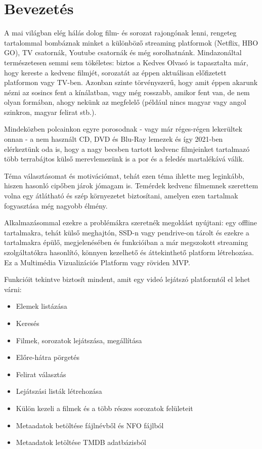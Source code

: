 \chapter{Bevezetés} %
\label{ch:intro}

A mai világban elég hálás dolog film- és sorozat rajongónak lenni, rengeteg tartalommal bombáznak minket a különböző streaming platformok (Netflix, HBO GO), TV csatornák, Youtube csatornák és még sorolhatnánk. Mindazonáltal természetesen semmi sem tökéletes: biztos a Kedves Olvasó is tapasztalta már, hogy kereste a kedvenc filmjét, sorozatát az éppen aktuálisan előfizetett platformon vagy TV-ben. Azonban szinte törvényszerű, hogy amit éppen akarunk nézni az sosincs fent a kínálatban, vagy még rosszabb, amikor fent van, de nem olyan formában, ahogy nekünk az megfelelő (például nincs magyar vagy angol szinkron, magyar felirat stb.).

Mindeközben polcainkon egyre porosodnak - vagy már réges-régen lekerültek onnan - a nem használt CD, DVD és Blu-Ray lemezek és így 2021-ben elérkeztünk oda is, hogy a nagy becsben tartott kedvenc filmjeinket tartalmazó több terrabájtos külső merevlemezünk is a por és a feledés martalékává válik.

Téma választásomat és motivációmat, tehát ezen téma ihlette meg leginkább, hiszen hasonló cipőben járok jómagam is. Temérdek kedvenc filmemnek szerettem volna egy átlátható és szép környezetet biztosítani, amelyen ezen tartalmak fogyasztása még nagyobb élmény.

Alkalmazásommal ezekre a problémákra szeretnék megoldást nyújtani: egy offline tartalmakra, tehát külső meghajtón, SSD-n vagy pendrive-on tárolt és ezekre a tartalmakra épülő, megjelenésében és funkcióiban a már megszokott streaming szolgáltatókra hasonlító, könnyen kezelhető és áttekinthető platform létrehozása.\\
Ez a Multimédia Vizualizációs Platform vagy röviden MVP.

Funkcióit tekintve biztosít mindent, amit egy videó lejátszó platformtól el lehet várni:
\begin{itemize}
    \item Elemek listázása
    \item Keresés
	\item Filmek, sorozatok lejátszása, megállítása
	\item Előre-hátra pörgetés
	\item Felirat választás
	\item Lejátszási listák létrehozása
	\item Külön kezeli a filmek és a több részes sorozatok felületeit
	\item Metaadatok betöltése fájlnévből és NFO fájlból
	\item Metaadatok letöltése TMDB adatbázisból
\end{itemize}

